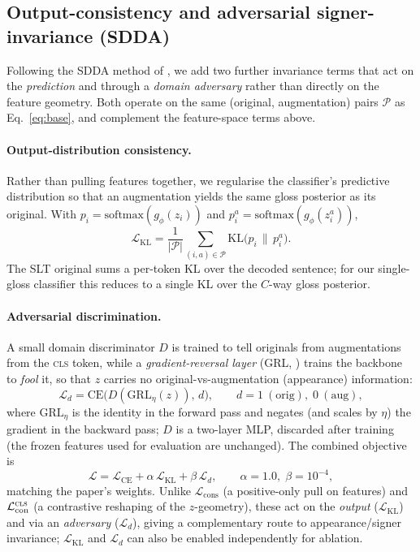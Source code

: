\subsection{Output-consistency and adversarial signer-invariance (SDDA)}
\label{sec:sdda}
Following the SDDA method of \citet{fu2024sdda}, we add two further invariance terms that act on
the \emph{prediction} and through a \emph{domain adversary} rather than directly on the feature
geometry. Both operate on the same (original, augmentation) pairs $\mathcal{P}$ as
Eq.~\eqref{eq:base}, and complement the feature-space terms above.

\paragraph{Output-distribution consistency.}
Rather than pulling features together, we regularise the classifier's predictive distribution so
that an augmentation yields the same gloss posterior as its original. With
$p_i = \mathrm{softmax}(g_\phi(z_i))$ and $p_i^{a} = \mathrm{softmax}(g_\phi(z_i^{a}))$,
\begin{equation}
\mathcal{L}_{\mathrm{KL}} =
\frac{1}{|\mathcal{P}|}\!\!\sum_{(i,a)\in\mathcal{P}}\!\!\mathrm{KL}\big(p_i \,\big\|\, p_i^{a}\big).
\label{eq:sdda-kl}
\end{equation}
The SLT original sums a per-token KL over the decoded sentence; for our single-gloss classifier
this reduces to a single KL over the $C$-way gloss posterior.

\paragraph{Adversarial discrimination.}
A small domain discriminator $D$ is trained to tell originals from augmentations from the
\textsc{cls} token, while a \emph{gradient-reversal layer} (GRL, \citet{ganin2015}) trains the
backbone to \emph{fool} it, so that $z$ carries no original-vs-augmentation (appearance)
information:
\begin{equation}
\mathcal{L}_{d} = \mathrm{CE}\big(D(\mathrm{GRL}_\eta(z)),\, d\big),
\qquad d = 1\ (\text{orig}),\; 0\ (\text{aug}),
\label{eq:sdda-disc}
\end{equation}
where $\mathrm{GRL}_\eta$ is the identity in the forward pass and negates (and scales by $\eta$)
the gradient in the backward pass; $D$ is a two-layer MLP, discarded after training (the frozen
features used for evaluation are unchanged). The combined objective is
\begin{equation}
\mathcal{L} = \mathcal{L}_{\mathrm{CE}}
            + \alpha\,\mathcal{L}_{\mathrm{KL}}
            + \beta\,\mathcal{L}_{d},
\qquad \alpha = 1.0,\; \beta = 10^{-4},
\label{eq:sdda-total}
\end{equation}
matching the paper's weights. Unlike $\mathcal{L}_{\mathrm{cons}}$ (a positive-only pull on
features) and $\mathcal{L}_{\mathrm{con}}^{\textsc{cls}}$ (a contrastive reshaping of the
$z$-geometry), these act on the \emph{output} ($\mathcal{L}_{\mathrm{KL}}$) and via an
\emph{adversary} ($\mathcal{L}_d$), giving a complementary route to appearance/signer invariance;
$\mathcal{L}_{\mathrm{KL}}$ and $\mathcal{L}_d$ can also be enabled independently for ablation.

